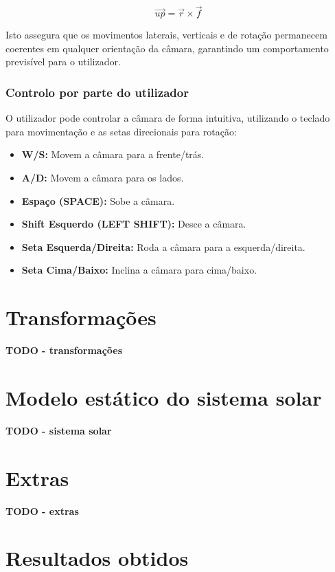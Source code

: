 \documentclass[12pt, a4paper]{article}
\begin{document}
\[
    \vec{up} = \vec{r} \times \vec{f}
\]

Isto assegura que os movimentos laterais, verticais e de rotação permanecem coerentes em
qualquer orientação da câmara, garantindo um comportamento previsível para o utilizador.

\subsubsection{Controlo por parte do utilizador}

O utilizador pode controlar a câmara de forma intuitiva, utilizando o teclado para movimentação
e as setas direcionais para rotação:

\begin{itemize}
    \item \textbf{W/S:} Movem a câmara para a frente/trás.
    \item \textbf{A/D:} Movem a câmara para os lados.
    \item \textbf{Espaço (SPACE):} Sobe a câmara.
    \item \textbf{Shift Esquerdo (LEFT SHIFT):} Desce a câmara.
    \item \textbf{Seta Esquerda/Direita:} Roda a câmara para a esquerda/direita.
    \item \textbf{Seta Cima/Baixo:} Inclina a câmara para cima/baixo.
\end{itemize}

\section{Transformações}

\textbf{\color{red} TODO - transformações}

\section{Modelo estático do sistema solar}

\textbf{\color{red} TODO - sistema solar}

\section{Extras}

\textbf{\color{red} TODO - extras}

\section{Resultados obtidos}
\end{document}
